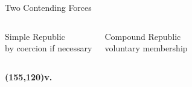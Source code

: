 \begin{frame}{Two Contending Forces}
    \begin{columns}[onlytextwidth]
            \begin{varblock}[0.93\textwidth]{}\centering \huge{Simple Republic} \\ \vspace{20pt} by coercion if necessary\end{varblock}

            \begin{varblock}[0.93\textwidth]{}\centering \huge{Compound Republic} \\ \vspace{20pt} voluntary membership\end{varblock}
    \end{columns}
    \textbf{\huge{ \color{red}
        \Put(155,120){v.}
    }}
\end{frame}

%

